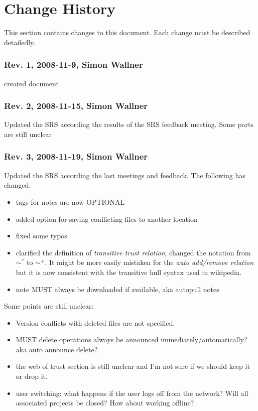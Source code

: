 \section{Change History}
This section contains changes to this document. Each change must be described detailedly.
\subsubsection{Rev. 1, 2008-11-9, Simon Wallner}
created document

\subsubsection{Rev. 2, 2008-11-15, Simon Wallner}
Updated the SRS according the results of the SRS feedback meeting. Some parts are still unclear

\subsubsection{Rev. 3, 2008-11-19, Simon Wallner}
Updated the SRS according the last meetings and feedback. The following has changed: 
\begin{itemize}
\item tags for notes are now OPTIONAL
\item added option for saving conflicting files to another location
\item fixed some typos
\item clarified the definition of \emph{transitive trust relation}, changed the notation from $\sim ^*$ to $\sim ^+$. It might be more easily mistaken for the \emph{auto add/remove relation} but it is now consistent with the transitive hull syntax used in wikipedia.
\item note MUST always be downloaded if available, aka autopull notes 
\end{itemize}
Some points are still unclear:
\begin{itemize}
\item Version conflicts with deleted files are not specified.
\item MUST delete operations always be announced immediately/automatically? aka auto announce delete?
\item the web of trust section is still unclear and I'm not sure if we should keep it or drop it.
\item user switching: what happens if the user logs off from the network? Will all associated projects be closed? How about working offline?
\end{itemize}





